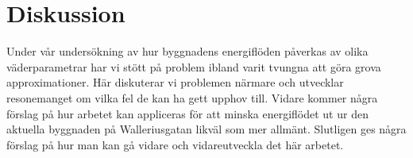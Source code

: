 \chapter{Diskussion}

Under vår undersökning av hur byggnadens energiflöden påverkas av olika 
väderparametrar har vi stött på problem ibland varit tvungna att göra grova 
approximationer. Här diskuterar vi problemen närmare och utvecklar resonemanget om
 vilka fel de kan ha gett upphov till. Vidare kommer några förslag på hur arbetet kan
 appliceras för att minska energiflödet ut ur den aktuella byggnaden på Walleriusgatan 
 likväl som mer allmänt. Slutligen ges några förslag på hur man kan gå vidare och 
 vidareutveckla det här arbetet. 
  










